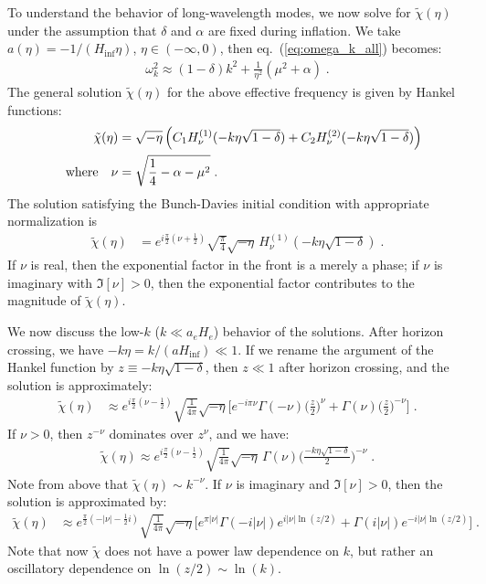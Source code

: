 \documentclass[11pt,a4paper]{article}
\newcommand{\eref}[1]{eq.~(\ref{#1})}
\begin{document}
\begin{appendix}
To understand the behavior of long-wavelength modes, we now solve for $\tilde{\chi}(\eta)$ under the assumption that $\delta$ and $\alpha$ are fixed during inflation.
We take \(a(\eta) = -1/(H_{\mathrm{inf}} \eta)\), \(\eta \in (-\infty,0)\), then \eref{eq:omega_k_all} becomes:
\begin{align}
  \omega_k^2 \approx (1 - \delta) k^2 + \frac{1}{\eta^2} (\mu^2 + \alpha)
  \;.
\end{align}
The general solution $\tilde{\chi}(\eta)$ for the above effective frequency is given by Hankel functions:
\begin{align}
  \tilde{\chi}(\eta) &= \sqrt{-\eta}
  \left( 
  C_1 H^{(1)}_\nu(-k \eta \sqrt{1-\delta}) 
  + C_2 H^{(2)}_\nu(-k \eta \sqrt{1-\delta})
  \right) \nonumber \\
  \qq{where} \nu &= \sqrt{\frac14 - \alpha - \mu^2}
  \;.
\end{align}
The solution satisfying the Bunch-Davies initial condition with appropriate normalization is
\begin{align}
 \tilde{\chi}(\eta) &= e^{i \frac{\pi}{2} (\nu + \frac12)} \sqrt{\frac{\pi}{4}} \sqrt{-\eta}\, H^{(1)}_\nu(-k \eta \sqrt{1-\delta})
  \;.
\end{align}
If \(\nu\) is real, then the exponential factor in the front is a merely a phase; if \(\nu\) is imaginary with \(\Im[\nu] > 0\), then the exponential factor contributes to the magnitude of $\tilde{\chi}(\eta)$.

We now discuss the low-\(k\) (\(k \ll a_e H_e\)) behavior of the solutions.  After horizon crossing, we have \(-k\eta = k/(a H_{\mathrm{inf}}) \ll 1\).  If we rename the argument of the Hankel function by \(z \equiv -k \eta \sqrt{1-\delta}\), then \(z \ll 1\) after horizon crossing, and the solution is approximately: 
\begin{align}
\tilde{\chi}(\eta) 
&\approx e^{i \frac{\pi}{2} (\nu - \frac12)} \sqrt{\frac{1}{4\pi}} \sqrt{-\eta} \Big[ e^{-i\pi\nu} \Gamma(-\nu) \Big(\frac{z}{2} \Big)^\nu + \Gamma(\nu) \Big(\frac{z}{2} \Big)^{-\nu} \Big] 
\;.
\end{align}
If \(\nu > 0\), then \(z^{-\nu}\) dominates over \(z^\nu\), and we have:
\begin{align}
\tilde{\chi}(\eta) \approx e^{i \frac{\pi}{2} (\nu - \frac12)} \sqrt{\frac{1}{4\pi}} \sqrt{-\eta} \, \Gamma(\nu) \Big( \frac{-k \eta \sqrt{1-\delta}}{2} \Big)^{-\nu} 
\;.
\end{align}
Note from above that $\tilde{\chi}(\eta)  \sim k^{-\nu}$.
If \(\nu\) is imaginary and \(\Im[\nu] > 0\), then the solution is approximated by:
\begin{align}
\tilde{\chi}(\eta)  &\approx 
e^{\frac{\pi}{2} (- |\nu| - \frac12 i)} \sqrt{\frac{1}{4\pi}} \sqrt{-\eta} \Big[ e^{\pi |\nu|} \Gamma(-i|\nu|) e^{i|\nu| \ln(z/2)} + \Gamma(i|\nu|) e^{-i|\nu| \ln(z/2)} \Big]
\;.
\end{align}
Note that now $\tilde{\chi}$ does not have a power law dependence on $k$, but rather an oscillatory dependence on \(\ln(z/2) \sim \ln(k)\).


\end{appendix}
\end{document}
